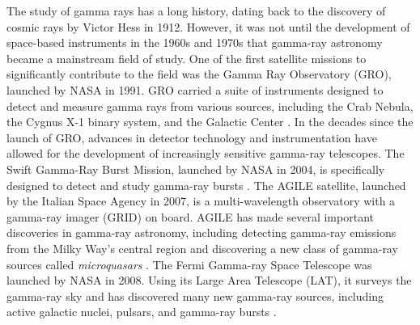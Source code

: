 The study of gamma rays has a long history, dating back to the discovery of cosmic rays by Victor Hess in 1912. However, it was not until the development of space-based instruments in the 1960s and 1970s that gamma-ray astronomy became a mainstream field of study. One of the first satellite missions to significantly contribute to the field was the Gamma Ray Observatory (GRO), launched by NASA in 1991. GRO carried a suite of instruments designed to detect and measure gamma rays from various sources, including the Crab Nebula, the Cygnus X-1 binary system, and the Galactic Center \cite{mattox_et_al_1996}. In the decades since the launch of GRO, advances in detector technology and instrumentation have allowed for the development of increasingly sensitive gamma-ray telescopes. The Swift Gamma-Ray Burst Mission, launched by NASA in 2004, is specifically designed to detect and study gamma-ray bursts \cite{swift_2004}. The AGILE satellite, launched by the Italian Space Agency in 2007, is a multi-wavelength observatory with a gamma-ray imager (GRID) on board. AGILE has made several important discoveries in gamma-ray astronomy, including detecting gamma-ray emissions from the Milky Way's central region and discovering a new class of gamma-ray sources called \textit{microquasars} \cite{Tavani_2009}. The Fermi Gamma-ray Space Telescope was launched by NASA in 2008. Using its Large Area Telescope (LAT), it surveys the gamma-ray sky and has discovered many new gamma-ray sources, including active galactic nuclei, pulsars, and gamma-ray bursts \cite{Abdo2010}. 
